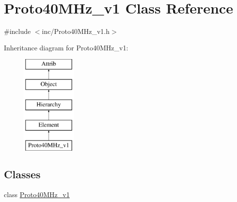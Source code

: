 \hypertarget{classProto40MHz__v1}{}\section{Proto40\+M\+Hz\+\_\+v1 Class Reference}
\label{classProto40MHz__v1}


{\ttfamily \#include $<$inc/\+Proto40\+M\+Hz\+\_\+v1.\+h$>$}

Inheritance diagram for Proto40\+M\+Hz\+\_\+v1\+:\begin{figure}[H]
\begin{center}
\leavevmode
\includegraphics[height=5.000000cm]{classProto40MHz__v1}
\end{center}
\end{figure}
\subsection*{Classes}
\begin{DoxyCompactItemize}
\item 
class \hyperlink{classProto40MHz__v1_1_1Proto40MHz__v1}{Proto40\+M\+Hz\+\_\+v1}
\end{DoxyCompactItemize}

